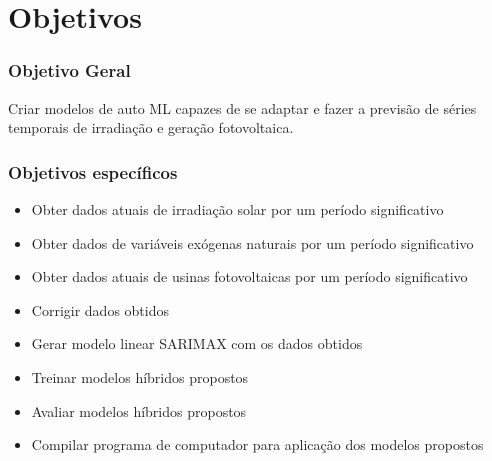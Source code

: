 \chapter{Objetivos}
\label{cap:objetivos}

\subsection{Objetivo Geral}

Criar modelos de auto ML capazes de se adaptar e fazer a previsão de séries temporais de irradiação e geração fotovoltaica.

\subsection{Objetivos específicos}

\begin{itemize}
    \item Obter dados atuais de irradiação solar por um período significativo
    \item Obter dados de variáveis exógenas naturais por um período significativo
    \item Obter dados atuais de usinas fotovoltaicas por um período significativo
    \item Corrigir dados obtidos
    \item Gerar modelo linear SARIMAX com os dados obtidos
    \item Treinar modelos híbridos propostos
    \item Avaliar modelos híbridos propostos
    \item Compilar programa de computador para aplicação dos modelos propostos
\end{itemize}